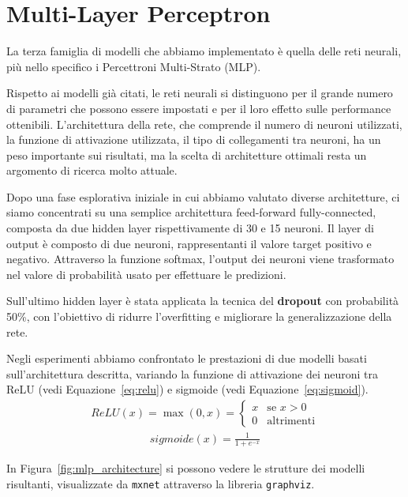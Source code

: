 \section{Multi-Layer Perceptron}
La terza famiglia di modelli che abbiamo implementato è quella delle reti 
neurali, più nello specifico i Percettroni Multi-Strato (MLP).

Rispetto ai modelli già citati, le reti neurali si distinguono per il grande 
numero di parametri che possono essere impostati e per il loro effetto sulle 
performance ottenibili. L'architettura della rete, che comprende il numero di 
neuroni utilizzati, la funzione di attivazione utilizzata, il tipo di 
collegamenti tra neuroni, ha un peso importante sui risultati, ma la scelta di 
architetture ottimali resta un argomento di ricerca molto attuale.

Dopo una fase esplorativa iniziale in cui abbiamo valutato diverse 
architetture, ci siamo concentrati su una semplice architettura feed-forward 
fully-connected, composta da due hidden layer rispettivamente di 30 e 15 
neuroni. Il layer di output è composto di due neuroni, rappresentanti il valore 
target positivo e negativo. Attraverso la funzione softmax, l'output dei 
neuroni viene trasformato nel valore di probabilità usato per effettuare le 
predizioni.

Sull'ultimo hidden layer è stata applicata la tecnica del \textbf{dropout} con 
probabilità 50\%, con l'obiettivo di ridurre l'overfitting e migliorare la 
generalizzazione della rete.

Negli esperimenti abbiamo confrontato le prestazioni di due modelli basati 
sull'architettura descritta, variando la funzione di attivazione dei neuroni 
tra ReLU (vedi Equazione~\ref{eq:relu}) e sigmoide (vedi 
Equazione~\ref{eq:sigmoid}). 
\begin{align}
	ReLU(x) = \max(0, x) = \begin{cases} 
		x & \mbox{se }x > 0 \\
		0 & \mbox{altrimenti}
	\end{cases}
	\label{eq:relu}
\end{align}
\begin{align}
	sigmoide(x) = \frac{1}{1 + e^{-x}}
	\label{eq:sigmoid}
\end{align}

In Figura~\ref{fig:mlp_architecture} si possono vedere le
strutture dei modelli risultanti, visualizzate da \texttt{mxnet} attraverso la 
libreria \texttt{graphviz}.

